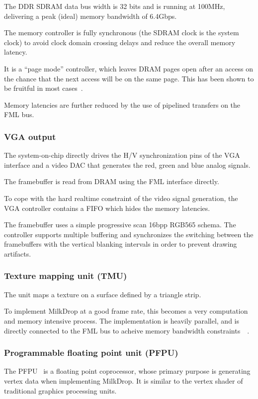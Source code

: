 \documentclass[a4paper,11pt,twocolumn]{paper}
\begin{document}
The DDR SDRAM data bus width is 32 bits and is running at 100MHz, delivering a peak (ideal) memory bandwidth of 6.4Gbps.

The memory controller is fully synchronous (the SDRAM clock is the system clock) to avoid clock domain crossing delays and reduce the overall memory latency.

It is a ``page mode'' controller, which leaves DRAM pages open after an access on the chance that the next access will be on the same page. This has been shown to be fruitful in most cases~\cite{pagemode}.

Memory latencies are further reduced by the use of pipelined transfers on the FML bus.

\subsubsection{VGA output}
The system-on-chip directly drives the H/V synchronization pins of the VGA interface and a video DAC that generates the red, green and blue analog signals.

The framebuffer is read from DRAM using the FML interface directly.

To cope with the hard realtime constraint of the video signal generation, the VGA controller contains a FIFO which hides the memory latencies.

The framebuffer uses a simple progressive scan 16bpp RGB565 schema. The controller supports multiple buffering and synchronizes the switching between the framebuffers with the vertical blanking intervals in order to prevent drawing artifacts.

\subsubsection{Texture mapping unit (TMU)}
The unit maps a texture on a surface defined by a triangle strip.

To implement MilkDrop at a good frame rate, this becomes a very computation and memory intensive process. The implementation is heavily parallel, and is directly connected to the FML bus to acheive memory bandwidth constraints~\cite{confslides}~\cite{tmu}.

\subsubsection{Programmable floating point unit (PFPU)}
The PFPU~\cite{pfpu} is a floating point coprocessor, whose primary purpose is generating vertex data when implementing MilkDrop. It is similar to the vertex shader of traditional graphics processing units.
\end{document}
